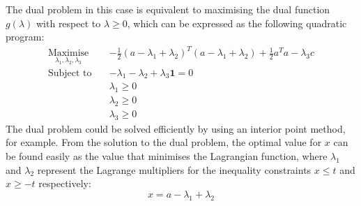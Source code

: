 The dual problem in this case is equivalent to maximising the dual function $g(\lambda)$ with respect to $\lambda\ge0$, which can be expressed as the following quadratic program:
\begin{align*}
    \underset{\lambda_1, \lambda_2, \lambda_3}{\text{Maximise}} \quad & -\frac{1}{2}(a - \lambda_1 + \lambda_2)^T(a - \lambda_1 + \lambda_2) + \frac{1}{2}a^Ta - \lambda_3c \\
    \text{Subject to} \quad & -\lambda_1 - \lambda_2 + \lambda_3\mathbf{1} = 0 \\
    & \lambda_1 \ge 0 \\
    & \lambda_2 \ge 0 \\
    & \lambda_3 \ge 0
\end{align*}
The dual problem could be solved efficiently by using an interior point method, for example. From the solution to the dual problem, the optimal value for $x$ can be found easily as the value that minimises the Lagrangian function, where $\lambda_1$ and $\lambda_2$ represent the Lagrange multipliers for the inequality constraints $x \le t$ and $x \ge -t$ respectively:
\begin{equation*}
    x = a - \lambda_1 + \lambda_2
\end{equation*}

